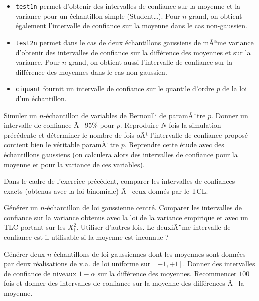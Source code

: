 \begin{itemize}
\item \texttt{test1n} permet d'obtenir des intervalles de confiance sur la
  moyenne et la variance pour un échantillon simple (Student\ldots). Pour $n$
  grand, on obtient également l'intervalle de confiance sur la moyenne dans le
  cas non-gaussien.
\item \texttt{test2n} permet dans le cas de deux échantillons gaussiens de
  mÃªme variance d'obtenir des intervalles de confiance sur la différence des
  moyennes et sur la variance. Pour $n$ grand, on obtient aussi l'intervalle
  de confiance sur la différence des moyennes dans le cas non-gaussien.
\item \texttt{ciquant} fournit un intervalle de confiance sur le quantile
  d'ordre $p$ de la loi d'un échantillon.
\end{itemize}

\begin{exo}
  Simuler un $n$-échantillon de variables de Bernoulli de paramÃ¨tre $p$.
  Donner un intervalle de confiance Ã  $95\%$ pour $p$. Reproduire $N$ fois la
  simulation précédente et déterminer le nombre de fois oÃ¹ l'intervalle de
  confiance proposé contient bien le véritable paramÃ¨tre $p$. Reprendre cette
  étude avec des échantillons gaussiens (on calculera alors des intervalles de
  confiance pour la moyenne et pour la variance de ces variables).
\end{exo}

\begin{exo}
  Dans le cadre de l'exercice précédent, comparer les intervalles de
  confiances exacts (obtenus avec la loi binomiale) Ã  ceux donnés par le TCL.
\end{exo}

\begin{exo}
  Générer un $n$-échantillon de loi gaussienne centré. Comparer les
  intervalles de confiance sur la variance obtenus avec la loi de la variance
  empirique et avec un TLC portant sur les $X_i^2$. Utiliser d'autres lois. Le
  deuxiÃ¨me intervalle de confiance est-il utilisable si la moyenne est
  inconnue ?
\end{exo}

\begin{exo}
  Générer deux $n$-échantillons de loi gaussiennes dont les moyennes sont
  données par deux réalisations de v.a. de loi uniforme sur $[-1,+1]$. Donner
  des intervalles de confiance de niveaux $1-\alpha$ sur la différence des
  moyennes. Recommencer $100$ fois et donner des intervalles de confiance sur
  la moyenne des différences Ã  la moyenne.
\end{exo}

